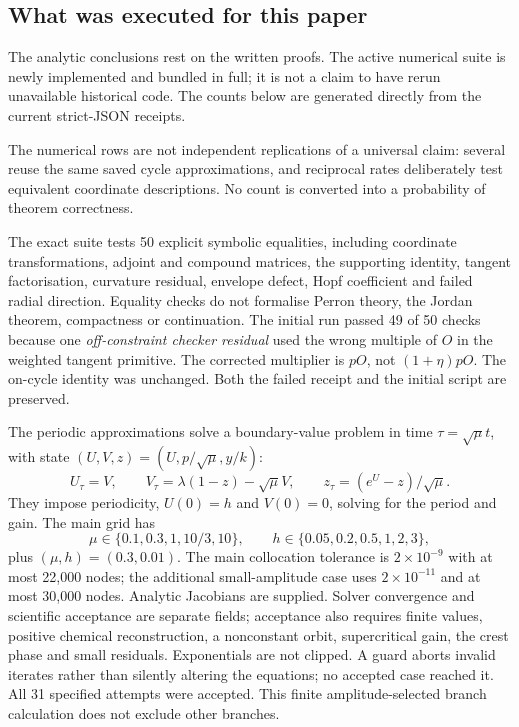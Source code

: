 \documentclass[11pt,a4paper]{article}
\numberwithin{equation}{section}
\theoremstyle{remark}\newtheorem{remark}[theorem]{Remark}
\begin{document}
\subsection{What was executed for this paper}
The analytic conclusions rest on the written proofs. The active numerical suite is newly implemented and bundled in full; it is not a claim to have rerun unavailable historical code. The counts below are generated directly from the current strict-JSON receipts.
\begin{center}\small\end{center}
The numerical rows are not independent replications of a universal claim: several reuse the same saved cycle approximations, and reciprocal rates deliberately test equivalent coordinate descriptions. No count is converted into a probability of theorem correctness.

The exact suite tests 50 explicit symbolic equalities, including coordinate transformations, adjoint and compound matrices, the supporting identity, tangent factorisation, curvature residual, envelope defect, Hopf coefficient and failed radial direction. Equality checks do not formalise Perron theory, the Jordan theorem, compactness or continuation. The initial run passed 49 of 50 checks because one \emph{off-constraint checker residual} used the wrong multiple of $O$ in the weighted tangent primitive. The corrected multiplier is $pO$, not $(1+\eta)pO$. The on-cycle identity was unchanged. Both the failed receipt and the initial script are preserved.

The periodic approximations solve a boundary-value problem in time $\tau=\sqrt\mu t$, with state $(U,V,z)=(U,p/\sqrt\mu,y/k)$:
\[
U_\tau=V,\qquad V_\tau=\lambda(1-z)-\sqrt\mu V,\qquad
z_\tau=(e^U-z)/\sqrt\mu.
\]
They impose periodicity, $U(0)=h$ and $V(0)=0$, solving for the period and gain. The main grid has
\[
\mu\in\{0.1,0.3,1,10/3,10\},\qquad
h\in\{0.05,0.2,0.5,1,2,3\},
\]
plus $(\mu,h)=(0.3,0.01)$. The main collocation tolerance is $2\times10^{-9}$ with at most 22,000 nodes; the additional small-amplitude case uses $2\times10^{-11}$ and at most 30,000 nodes. Analytic Jacobians are supplied. Solver convergence and scientific acceptance are separate fields; acceptance also requires finite values, positive chemical reconstruction, a nonconstant orbit, supercritical gain, the crest phase and small residuals. Exponentials are not clipped. A guard aborts invalid iterates rather than silently altering the equations; no accepted case reached it. All 31 specified attempts were accepted. This finite amplitude-selected branch calculation does not exclude other branches.
\end{document}

